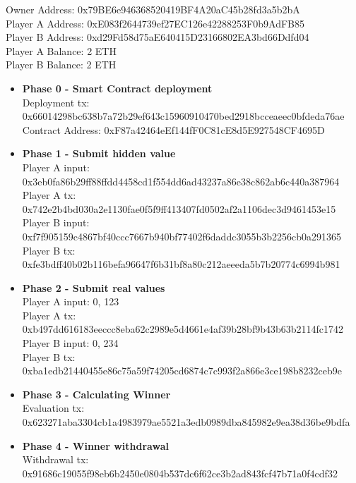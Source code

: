 \documentclass[12pt,a4paper]{article}
\begin{document}
Owner Address: 0x79BE6e946368520419BF4A20aC45b28fd3a5b2bA \\
Player A Address: 0xE083f2644739ef27EC126e42288253F0b9AdFB85 \\
Player B Address: 0xd29Fd58d75aE640415D23166802EA3bd66Ddfd04 \\

Player A Balance: 2 ETH \\
Player B Balance: 2 ETH \\

\begin{itemize}
    \item \textbf{Phase 0 - Smart Contract deployment} \\
    
    Deployment tx: 0x66014298bc638b7a72b29ef643c15960910470bed2918bcceaeec0bfdeda76ae \\
    Contract Address: 0xF87a42464eEf144fF0C81cE8d5E927548CF4695D \\

    \item \textbf{Phase 1 - Submit hidden value} \\
    
    Player A input: 0x3eb0fa86b29ff88ffdd4458cd1f554dd6ad43237a86e38c862ab6c440a387964 \\
    Player A tx: 0x742e2b4bd030a2e1130fae0f5f9ff413407fd0502af2a1106dec3d9461453e15 \\

    Player B input: 0xf7f905159c4867bf40ccc7667b940bf77402f6daddc3055b3b2256cb0a291365 \\
    Player B tx: 0xfe3bdff40b02b116befa96647f6b31bf8a80c212aeeeda5b7b20774c6994b981 \\

    \item \textbf{Phase 2 - Submit real values} \\

    Player A input: 0, 123 \\
    Player A tx: 0xb497dd616183eeccc8eba62c2989e5d4661e4af39b28bf9b43b63b2114fc1742 \\

    Player B input: 0, 234 \\
    Player B tx: 0xba1edb21440455e86c75a59f74205cd6874c7c993f2a866e3ce198b8232ceb9e \\

    \item \textbf{Phase 3 - Calculating Winner} \\
    
    Evaluation tx: 0x623271aba3304cb1a4983979ae5521a3edb0989dba845982e9ea38d36be9bdfa\\

    \item \textbf{Phase 4 - Winner withdrawal} \\
    
    Withdrawal tx: 0x91686c19055f98eb6b2450e0804b537dc6f62ce3b2ad843fcf47b71a0f4cdf32 \\
\end{itemize}
\end{document}
